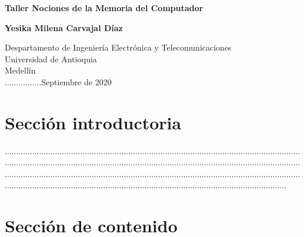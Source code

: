 \documentclass{article}
\begin{document}
\begin{titlepage}
    \begin{center}
        \vspace*{1cm}
            
        \Huge
        \textbf{Taller Nociones de la Memoria del Computador}
            
        \vspace{0.5cm}
        \LARGE
            
        \vspace{1.5cm}
            
        \textbf{Yesika Milena Carvajal Díaz}
            
        \vfill
            
        \vspace{0.8cm}
            
        \Large
        Despartamento de Ingeniería Electrónica y Telecomunicaciones\\
        Universidad de Antioquia\\
        Medellín\\
        ................Septiembre de 2020
            
    \end{center}
\end{titlepage}

\tableofcontents

\section{Sección introductoria}

..............................................................................................................................................................................................................................................................................................................................................................................................................................................................................................................................


\section{Sección de contenido} \label{contenido}
\end{document}
